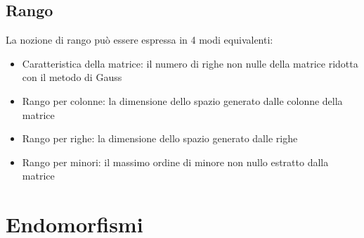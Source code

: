 \documentclass{article}
\begin{document}
\subsection{Rango}
La nozione di rango può essere espressa in 4 modi equivalenti:
\begin{itemize}
    \item Caratteristica della matrice: il numero di righe non nulle della matrice ridotta con il metodo di Gauss
    \item Rango per colonne: la dimensione dello spazio generato dalle colonne della matrice
    \item Rango per righe: la dimensione dello spazio generato dalle righe
    \item Rango per minori: il massimo ordine di minore non nullo estratto dalla matrice
\end{itemize}

\section{Endomorfismi}
\end{document}
